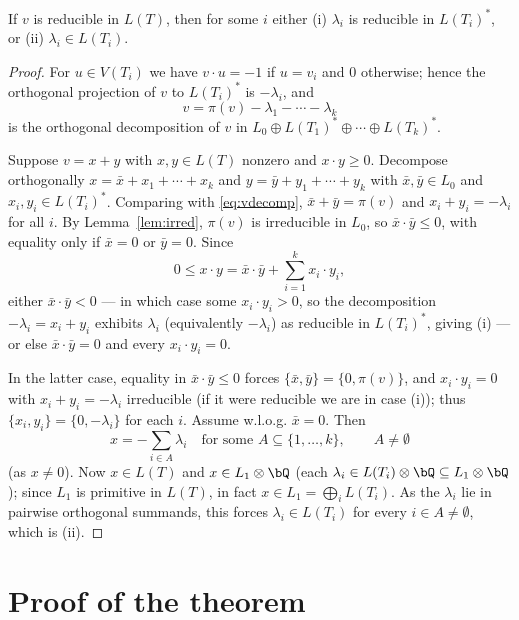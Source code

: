 \begin{lem}
\label{lem:dichotomy}
If $v$ is reducible in $L(T)$, then for some $i$ either
\textup{(i)} $\lambda_i$ is reducible in $L(T_i)^\ast$, or \textup{(ii)} $\lambda_i\in L(T_i)$.
\end{lem}

\begin{proof}
For $u\in V(T_i)$ we have $v\cdot u=-1$ if $u=v_i$ and $0$ otherwise; hence the orthogonal
projection of $v$ to $L(T_i)^\ast$ is $-\lambda_i$, and
\begin{equation}
\label{eq:vdecomp}
v=\pi(v)-\lambda_1-\cdots-\lambda_k
\end{equation}
is the orthogonal decomposition of $v$ in $L_0\oplus L(T_1)^\ast\oplus\cdots\oplus
L(T_k)^\ast$.

Suppose $v=x+y$ with $x,y\in L(T)$ nonzero and $x\cdot y\ge0$.  Decompose orthogonally
$x=\bar x+x_1+\cdots+x_k$ and $y=\bar y+y_1+\cdots+y_k$ with $\bar x,\bar y\in L_0$ and
$x_i,y_i\in L(T_i)^\ast$.  Comparing with \eqref{eq:vdecomp}, $\bar x+\bar y=\pi(v)$ and
$x_i+y_i=-\lambda_i$ for all $i$.  By Lemma~\ref{lem:irred}, $\pi(v)$ is irreducible in
$L_0$, so $\bar x\cdot\bar y\le0$, with equality only if $\bar x=0$ or $\bar y=0$.  Since
\[
0\le x\cdot y=\bar x\cdot\bar y+\sum_{i=1}^k x_i\cdot y_i,
\]
either $\bar x\cdot\bar y<0$ — in which case some $x_i\cdot y_i>0$, so the decomposition
$-\lambda_i=x_i+y_i$ exhibits $\lambda_i$ (equivalently $-\lambda_i$) as reducible in
$L(T_i)^\ast$, giving (i) — or else $\bar x\cdot\bar y=0$ and every $x_i\cdot y_i=0$.

In the latter case, equality in $\bar x\cdot\bar y\le0$ forces $\{\bar x,\bar
y\}=\{0,\pi(v)\}$, and $x_i\cdot y_i=0$ with $x_i+y_i=-\lambda_i$ irreducible (if it were
reducible we are in case (i)); thus $\{x_i,y_i\}=\{0,-\lambda_i\}$ for each $i$.  Assume
w.l.o.g. $\bar x=0$.  Then
\[
x=-\sum_{i\in A}\lambda_i\quad\text{for some }A\subseteq\{1,\dots,k\},\qquad A\ne\emptyset
\]
(as $x\ne0$).  Now $x\in L(T)$ and $x\in L_1\otimes\bQ$ (each $\lambda_i\in L(T_i)\otimes\bQ
\subseteq L_1\otimes\bQ$); since $L_1$ is primitive in $L(T)$, in fact $x\in L_1=
\bigoplus_iL(T_i)$.  As the $\lambda_i$ lie in pairwise orthogonal summands, this forces
$\lambda_i\in L(T_i)$ for every $i\in A\ne\emptyset$, which is (ii).
\end{proof}

\section{Proof of the theorem}
\label{sec:finale}


